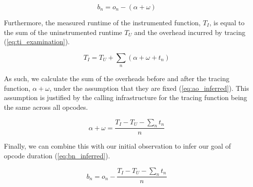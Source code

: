 \begin{equation}
    \label{eq:bn_examination}
    b_n = o_n - (\alpha + \omega)
\end{equation}

Furthermore, the measured runtime of the instrumented function, $T_I$, is equal to the sum of the uninstrumented runtime $T_U$ and the overhead incurred by tracing (\autoref{eq:ti_examination}).

\begin{equation}
    \label{eq:ti_examination}
    T_I = T_U + \sum_{n} (\alpha + \omega + t_n)
\end{equation}


As such, we calculate the sum of the overheads before and after the tracing function, $\alpha + \omega$, under the assumption that they are fixed (\autoref{eq:ao_inferred}). This assumption is justified by the calling infrastructure for the tracing function being the same across all opcodes.

\begin{equation}
    \label{eq:ao_inferred}
    \alpha + \omega = \frac{T_I - T_U - \sum_{n} t_n}{n}
\end{equation}

Finally, we can combine this with our initial observation to infer our goal of opcode duration (\autoref{eq:bn_inferred}).

\begin{equation}
    \label{eq:bn_inferred}
    b_n = o_n - \frac{T_I - T_U - \sum_{n} t_n}{n}
\end{equation}


